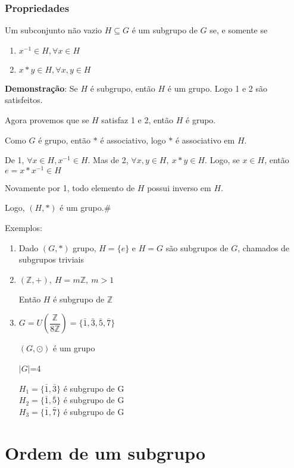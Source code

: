 \subsubsection{Propriedades}
\begin{proposicao}
Um subconjunto n{\~a}o vazio $H\subseteq G$ {\'e} um subgrupo de $G$ se, e somente se
\begin{enumerate}
\item $x^{-1}\in H,\forall x\in H$
\item $x*y\in H,\forall x,y\in H$
\end{enumerate}
\end{proposicao}

\textbf{Demonstra{\c c}{\~a}o}: Se $H$ {\'e} subgrupo, ent{\~a}o $H$ {\'e} um grupo. Logo 1 e 2 s{\~a}o satisfeitos.

Agora provemos que se $H$ satisfaz 1 e 2, ent{\~a}o $H$ {\'e} grupo.

Como $G$ {\'e} grupo, ent{\~a}o $*$ {\'e} associativo, logo $*$ {\'e} associativo em $H$.

De 1, $\forall x\in H,x^{-1}\in H$. Mas de 2, $\forall x,y\in H,\ x*y\in H$. Logo, se $x\in H$, ent{\~a}o $e=x*x^{-1}\in H$

Novamente por 1, todo elemento de $H$ possui inverso em $H$.

Logo, $(H,*)$ {\'e} um grupo.\#

Exemplos:
\begin{enumerate}
\item Dado $(G,*)$ grupo, $H=\{e\}$ e $H=G$ s{\~a}o subgrupos de $G$, chamados de subgrupos triviais
\item $(\mathbb{Z},+),\ H=m\mathbb{Z},\ m>1$

Ent{\~a}o $H$ {\'e} subgrupo de $\mathbb{Z}$
\item $G=U\left(\dfrac{\mathbb{Z}}{8\mathbb{Z}}\right)=\{\bar{1},\bar{3},\bar{5},\bar{7}\}$

$(G,\odot)$ {\'e} um grupo

$|G|$=4

$H_{1}=\{\bar{1},\bar{3}\}$ {\'e} subgrupo de G\\
$H_{2}=\{\bar{1},\bar{5}\}$ {\'e} subgrupo de G\\
$H_{3}=\{\bar{1},\bar{7}\}$ {\'e} subgrupo de G
\end{enumerate}

\section{Ordem de um subgrupo}

